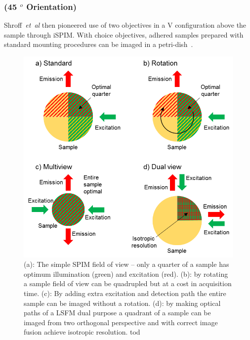 \subsubsection{(45 $^o$ Orientation)}

Shroff~\emph{et~al} then pioneered use of two objectives in a V configuration above the sample through iSPIM.\@
With choice objectives, adhered samples prepared with standard mounting procedures can be imaged in a petri-dish~\cite{kumar_dual-view_2014}.


\begin{figure}
	\centering
	\includegraphics[width=\columnwidth]{spim_optimal_imaging.png}
	\caption{
	(a): The simple SPIM field of view – only a quarter of a sample has optimum illumination (green) and excitation (red).
	(b): by rotating a sample field of view can be quadrupled but at a cost in acquisition time.
	(c): By adding extra excitation and detection path the entire sample can be imaged without a rotation.
	(d): by making optical paths of a LSFM dual purpose a quadrant of a sample can be imaged from two orthogonal perspective and with correct image fusion achieve isotropic resolution.
	tod}
	\label{spim_optimal_imaging}
\end{figure}

